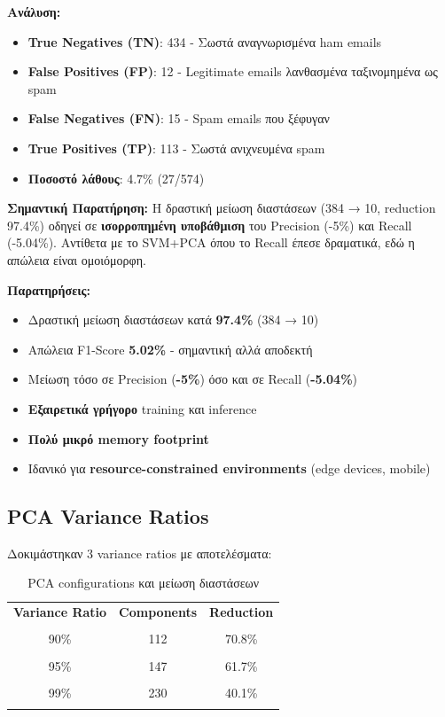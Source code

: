\documentclass[12pt,a4paper,twoside]{book}
\begin{document}
\textbf{Ανάλυση:}
\begin{itemize}
    \item \textbf{True Negatives (TN)}: 434 - Σωστά αναγνωρισμένα ham emails
    \item \textbf{False Positives (FP)}: 12 - Legitimate emails λανθασμένα ταξινομημένα ως spam
    \item \textbf{False Negatives (FN)}: 15 - Spam emails που ξέφυγαν
    \item \textbf{True Positives (TP)}: 113 - Σωστά ανιχνευμένα spam
    \item \textbf{Ποσοστό λάθους}: 4.7\% (27/574)
\end{itemize}

\textbf{Σημαντική Παρατήρηση:} Η δραστική μείωση διαστάσεων (384 → 10, reduction 97.4\%) οδηγεί σε \textbf{ισορροπημένη υποβάθμιση} του Precision (-5\%) και Recall (-5.04\%). Αντίθετα με το SVM+PCA όπου το Recall έπεσε δραματικά, εδώ η απώλεια είναι ομοιόμορφη.

\textbf{Παρατηρήσεις:}
\begin{itemize}
    \item Δραστική μείωση διαστάσεων κατά \textbf{97.4\%} (384 → 10)
    \item Απώλεια F1-Score \textbf{5.02\%} - σημαντική αλλά αποδεκτή
    \item Μείωση τόσο σε Precision (\textbf{-5\%}) όσο και σε Recall (\textbf{-5.04\%})
    \item \textbf{Εξαιρετικά γρήγορο} training και inference
    \item \textbf{Πολύ μικρό memory footprint}
    \item Ιδανικό για \textbf{resource-constrained environments} (edge devices, mobile)
\end{itemize}

\subsection{PCA Variance Ratios}

Δοκιμάστηκαν 3 variance ratios με αποτελέσματα:

\begin{table}[H]
    \centering
    \begin{tabular}{ccc}
        \hline
        \textbf{Variance Ratio} & \textbf{Components} & \textbf{Reduction} \\\\
        \hline
        90\%                    & 112                 & 70.8\%             \\\\
        95\%                    & 147                 & 61.7\%             \\\\
        99\%                    & 230                 & 40.1\%             \\\\
        \hline
    \end{tabular}
    \caption{PCA configurations και μείωση διαστάσεων}
\end{table}
\end{document}
